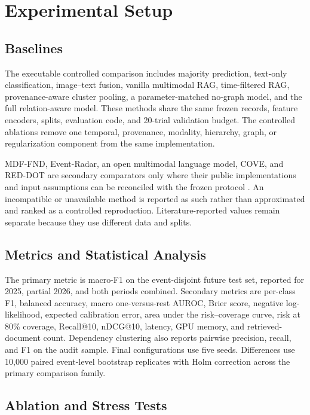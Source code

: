 \section{Experimental Setup}

\subsection{Baselines}

The executable controlled comparison includes majority prediction, text-only classification, image--text fusion, vanilla multimodal RAG, time-filtered RAG, provenance-aware cluster pooling, a parameter-matched no-graph model, and the full relation-aware model. These methods share the same frozen records, feature encoders, splits, evaluation code, and 20-trial validation budget. The controlled ablations remove one temporal, provenance, modality, hierarchy, graph, or regularization component from the same implementation.

MDF-FND, Event-Radar, an open multimodal language model, COVE, and RED-DOT are secondary comparators only where their public implementations and input assumptions can be reconciled with the frozen protocol \cite{lv2025mdffnd,ma2024eventradar,tonglet2025cove,papadopoulos2025reddot}. An incompatible or unavailable method is reported as such rather than approximated and ranked as a controlled reproduction. Literature-reported values remain separate because they use different data and splits.

\subsection{Metrics and Statistical Analysis}

The primary metric is macro-F1 on the event-disjoint future test set, reported for 2025, partial 2026, and both periods combined. Secondary metrics are per-class F1, balanced accuracy, macro one-versus-rest AUROC, Brier score, negative log-likelihood, expected calibration error, area under the risk--coverage curve, risk at 80\% coverage, Recall@10, nDCG@10, latency, GPU memory, and retrieved-document count. Dependency clustering also reports pairwise precision, recall, and F1 on the audit sample. Final configurations use five seeds. Differences use 10,000 paired event-level bootstrap replicates with Holm correction across the primary comparison family.

\subsection{Ablation and Stress Tests}


